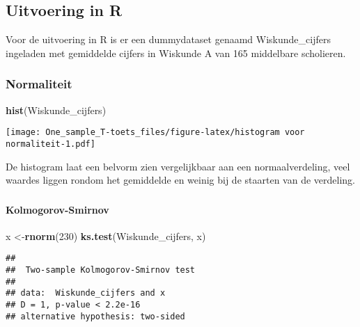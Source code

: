 \documentclass[]{article}
\newenvironment{Shaded}{\begin{snugshade}}{\end{snugshade}}
\newcommand{\DecValTok}[1]{\textcolor[rgb]{0.00,0.00,0.81}{#1}}
\newcommand{\KeywordTok}[1]{\textcolor[rgb]{0.13,0.29,0.53}{\textbf{#1}}}
\newcommand{\NormalTok}[1]{#1}
\let\oldparagraph\paragraph
\renewcommand{\paragraph}[1]{\oldparagraph{#1}\mbox{}}
\begin{document}
\hypertarget{uitvoering-in-r}{%
\subsection{Uitvoering in R}\label{uitvoering-in-r}}

Voor de uitvoering in R is er een dummydataset genaamd Wiskunde\_cijfers
ingeladen met gemiddelde cijfers in Wiskunde A van 165 middelbare
scholieren.

\hypertarget{normaliteit-1}{%
\subsubsection{Normaliteit}\label{normaliteit-1}}

\begin{Shaded}
\begin{Highlighting}[]
\KeywordTok{hist}\NormalTok{(Wiskunde_cijfers)}
\end{Highlighting}
\end{Shaded}

\texttt{[image: One\_sample\_T-toets\_files/figure-latex/histogram voor normaliteit-1.pdf]}

De histogram laat een belvorm zien vergelijkbaar aan een
normaalverdeling, veel waardes liggen rondom het gemiddelde en weinig
bij de staarten van de verdeling.

\hypertarget{section}{%
\subsubsection{}\label{section}}

\hypertarget{kolmogorov-smirnov}{%
\paragraph{Kolmogorov-Smirnov}\label{kolmogorov-smirnov}}

\begin{Shaded}
\begin{Highlighting}[]
\NormalTok{x <-}\KeywordTok{rnorm}\NormalTok{(}\DecValTok{230}\NormalTok{)}
\KeywordTok{ks.test}\NormalTok{(Wiskunde_cijfers, x)}
\end{Highlighting}
\end{Shaded}

\begin{verbatim}
## 
##  Two-sample Kolmogorov-Smirnov test
## 
## data:  Wiskunde_cijfers and x
## D = 1, p-value < 2.2e-16
## alternative hypothesis: two-sided
\end{verbatim}
\end{document}

